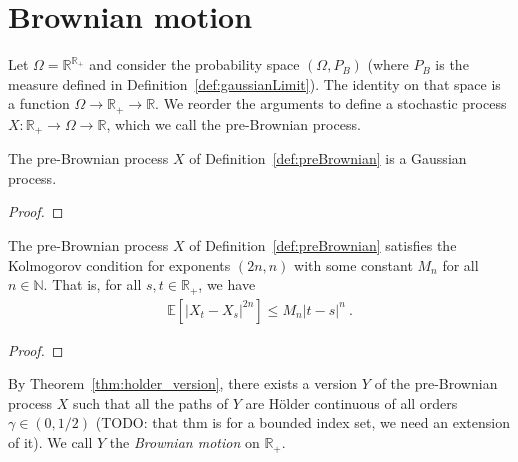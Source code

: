\chapter{Brownian motion}
\label{chap:brownian}


\begin{definition}\label{def:preBrownian}
Let $\Omega = \mathbb{R}^{\mathbb{R}_+}$ and consider the probability space $(\Omega, P_B)$ (where $P_B$ is the measure defined in Definition~\ref{def:gaussianLimit}).
The identity on that space is a function $\Omega \to \mathbb{R}_+ \to \mathbb{R}$.
We reorder the arguments to define a stochastic process $X : \mathbb{R}_+ \to \Omega \to \mathbb{R}$, which we call the pre-Brownian process.
\end{definition}


\begin{lemma}\label{lem:isGaussianProcess_preBrownian}
  The pre-Brownian process $X$ of Definition~\ref{def:preBrownian} is a Gaussian process.
\end{lemma}

\begin{proof}

\end{proof}


\begin{lemma}\label{lem:isKolmogorovProcess_preBrownian}
  The pre-Brownian process $X$ of Definition~\ref{def:preBrownian} satisfies the Kolmogorov condition for exponents $(2n,n)$ with some constant $M_n$ for all $n \in \mathbb{N}$.
  That is, for all $s, t \in \mathbb{R}_+$, we have
  \begin{align*}
    \mathbb{E} \left[ |X_t - X_s|^{2n} \right] \le M_n |t - s|^n
    \: .
  \end{align*}
\end{lemma}

\begin{proof}

\end{proof}


\begin{definition}\label{def:brownianMotion}
By Theorem~\ref{thm:holder_version}, there exists a version $Y$ of the pre-Brownian process $X$ such that all the paths of $Y$ are Hölder continuous of all orders $\gamma \in (0, 1/2)$ (TODO: that thm is for a bounded index set, we need an extension of it).
We call $Y$ the \emph{Brownian motion} on $\mathbb{R}_+$.
\end{definition}


